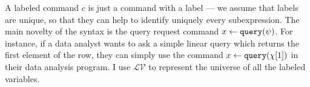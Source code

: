 % 
%
 A labeled command $c$ is just a command with a label --- we assume that labels are unique, so that they can help to identify uniquely every subexpression. 
 The main novelty of the syntax is the query request command $\mathrel{ x \leftarrow {\tt query}(\psi) }$. 
 For instance, if a data analyst wants to ask a simple linear query which returns the first element of the row, 
 they can simply use the command $ \mathrel{ x \leftarrow {\tt query}(\chi[1]) }$ in their data analysis program.
%
I use  
$\mathcal{LV}$ to represent the universe of all the labeled variables.
 